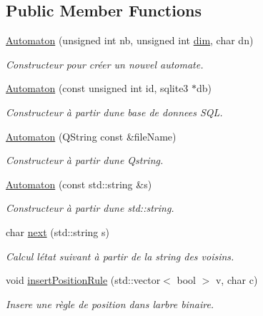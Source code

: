 \subsection*{Public Member Functions}
\begin{DoxyCompactItemize}
\item 
\mbox{\hyperlink{class_automaton_a6dee06d8b80717d8ac77e284871bb972}{Automaton}} (unsigned int nb, unsigned int \mbox{\hyperlink{automatamanager_8h_ae6fa959b9e8f9c638e0d82bf2c7dc5e7}{dim}}, char dn)
\begin{DoxyCompactList}\small\item\em Constructeur pour créer un nouvel automate. \end{DoxyCompactList}\item 
\mbox{\hyperlink{class_automaton_a30696da386c2b0119f41569272200e2c}{Automaton}} (const unsigned int id, sqlite3 $\ast$db)
\begin{DoxyCompactList}\small\item\em Constructeur à partir d\textquotesingle{}une base de donnees S\+QL. \end{DoxyCompactList}\item 
\mbox{\hyperlink{class_automaton_a1bd3904052977bba7901df924f1bef53}{Automaton}} (Q\+String const \&file\+Name)
\begin{DoxyCompactList}\small\item\em Constructeur à partir d\textquotesingle{}une Qstring. \end{DoxyCompactList}\item 
\mbox{\hyperlink{class_automaton_a6caf31920730c11d5fccc5918c8a3585}{Automaton}} (const std\+::string \&s)
\begin{DoxyCompactList}\small\item\em Constructeur à partir d\textquotesingle{}une std\+::string. \end{DoxyCompactList}\item 
char \mbox{\hyperlink{class_automaton_a6ce870e9a73694b40da41132198e7c31}{next}} (std\+::string s)
\begin{DoxyCompactList}\small\item\em Calcul l\textquotesingle{}état suivant à partir de la string des voisins. \end{DoxyCompactList}\item 
void \mbox{\hyperlink{class_automaton_ae77214bcd75f24d2cb56506e300a7991}{insert\+Position\+Rule}} (std\+::vector$<$ bool $>$ v, char c)
\begin{DoxyCompactList}\small\item\em Insere une règle de position dans l\textquotesingle{}arbre binaire. \end{DoxyCompactList}\item 

\end{DoxyCompactItemize}
